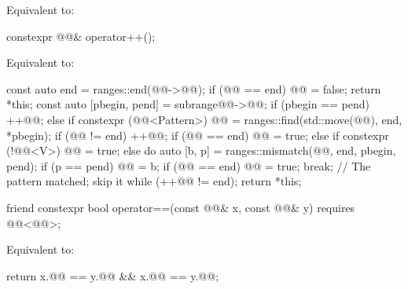 \begin{itemdescr}
\pnum
\effects
Equivalent to: 
\end{itemdescr}

%
\begin{itemdecl}
constexpr @@& operator++();
\end{itemdecl}

\begin{itemdescr}
\pnum
\effects
Equivalent to:
\begin{codeblock}
const auto end = ranges::end(@@->@@);
if (@@ == end) {
  @@ = false;
  return *this;
}
const auto [pbegin, pend] = subrange{@@->@@};
if (pbegin == pend) ++@@;
else if constexpr (@@<Pattern>) {
  @@ = ranges::find(std::move(@@), end, *pbegin);
  if (@@ != end) {
    ++@@;
    if (@@ == end)
      @@ = true;
    else if constexpr (!@@<V>)
      @@ = true;
  }
}
else {
  do {
    auto [b, p] = ranges::mismatch(@@, end, pbegin, pend);
    if (p == pend) {
      @@ = b;
      if (@@ == end)
        @@ = true;
      break;            // The pattern matched; skip it
    }
  } while (++@@ != end);
}
return *this;
\end{codeblock}
\end{itemdescr}

%
\begin{itemdecl}
friend constexpr bool operator==(const @@& x, const @@& y)
  requires @@<@@>;
\end{itemdecl}

\begin{itemdescr}
\pnum
\effects
Equivalent to:
\begin{codeblock}
return x.@@ == y.@@ && x.@@ == y.@@;
\end{codeblock}
\end{itemdescr}

